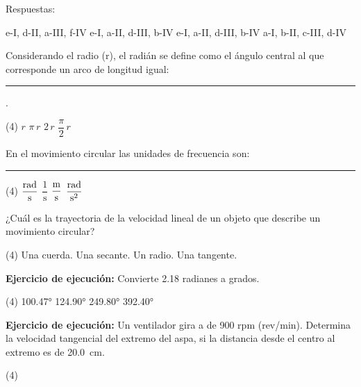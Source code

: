 \documentclass[12pt, letter]{exam}
\begin{document}
\begin{questions}
\begin{multicols}{2}
    \end{multicols}
    
    \vspace*{0.25cm}
    Respuestas:
    \begin{multicols}{2}
    \begin{tasks}
        \task e-I, d-II, a-III, f-IV
        \task e-I, a-II, d-III, b-IV
        \task e-I, a-II, d-III, b-IV
        \task a-I, b-II, c-III, d-IV
    \end{tasks}
    \end{multicols}
    \question Considerando el radio (r), el radián se define como el ángulo central al que corresponde un arco de longitud igual: \rule{2cm}{0.1mm}.
    \begin{tasks}(4)
        \task $r$
        \task $\pi \, r$
        \task $2 \, r$
        \task $\dfrac{\pi}{2} \, r$
    \end{tasks}
    \question En el movimiento circular las unidades de frecuencia son: \rule{2cm}{0.1mm}
    \begin{tasks}(4)
        \task $\displaystyle \unit[per-mode=fraction]{\radian\per\second}$
        \task $\dfrac{1}{\unit{\second}}$
        \task $\displaystyle \unit[per-mode=fraction]{\meter\per\second}$
        \task $\displaystyle \unit[per-mode=fraction]{\radian\per\square\second}$
    \end{tasks}
    \question ¿Cuál es la trayectoria de la velocidad lineal de un objeto que describe un movimiento circular?
    \begin{tasks}(4)
        \task Una cuerda.
        \task Una secante.
        \task Un radio.
        \task Una tangente.
    \end{tasks}
    \question \label{Ejercicio_01} \textbf{Ejercicio de ejecución: } Convierte 2.18 radianes a grados.
    \begin{tasks}(4)
        \task \ang{100.47}
        \task \ang{124.90}
        \task \ang{249.80}
        \task \ang{392.40}
    \end{tasks}
    \question \label{Ejercicio_02} \textbf{Ejercicio de ejecución: } Un ventilador gira a de 900 rpm (rev/min). Determina la velocidad tangencial del extremo del aspa, si la distancia desde el centro al extremo es de \SI{20.0}{\centi\meter}.
    \begin{tasks}(4)

\end{tasks}
\end{questions}
\end{document}
